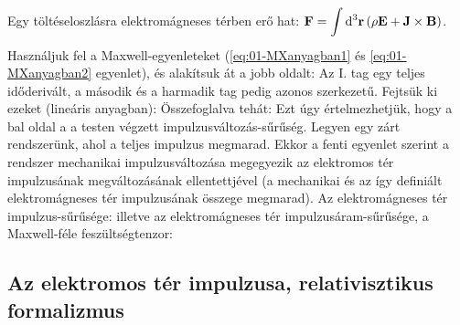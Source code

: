    Egy töltéseloszlásra elektromágneses térben erő hat: $\displaystyle\mathbf{F}=\int\limits_{}^{}\mathrm{d}^3\mathbf{r}\,(\rho\mathbf{E}+\mathbf{J}\times\mathbf{B})$. Használjuk fel a Maxwell-egyenleteket (\eqref{eq:01-MXanyagban1} és \eqref{eq:01-MXanyagban2} egyenlet), és alakítsuk át a jobb oldalt:
   Az I. tag egy teljes időderivált, a második és a harmadik tag pedig azonos szerkezetű. Fejtsük ki ezeket (lineáris anyagban):
   Összefoglalva tehát:
   Ezt úgy értelmezhetjük, hogy a bal oldal a a testen végzett impulzusváltozás-sűrűség. Legyen egy zárt rendszerünk, ahol a teljes impulzus megmarad. Ekkor a fenti egyenlet szerint a rendszer mechanikai impulzusváltozása megegyezik az elektromos tér impulzusának megváltozásának ellentettjével (a mechanikai és az így definiált elektromágneses tér impulzusának összege megmarad). Az elektromágneses tér impulzus-sűrűsége:
   illetve az elektromágneses tér impulzusáram-sűrűsége, a Maxwell-féle feszültségtenzor:
   
  \subsection{Az elektromos tér impulzusa, relativisztikus formalizmus}\label{ss:05-energiaimptenzor}
   
